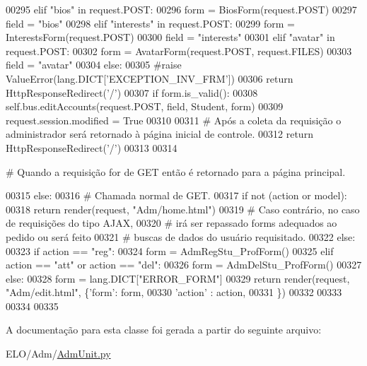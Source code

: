 \begin{DoxyCode}
00295             \textcolor{keywordflow}{elif} \textcolor{stringliteral}{"bios"} \textcolor{keywordflow}{in} request.POST:
00296                 form = BiosForm(request.POST)
00297                 field = \textcolor{stringliteral}{"bios"}
00298             \textcolor{keywordflow}{elif} \textcolor{stringliteral}{"interests"} \textcolor{keywordflow}{in} request.POST:
00299                 form = InterestsForm(request.POST)
00300                 field = \textcolor{stringliteral}{"interests"}
00301             \textcolor{keywordflow}{elif} \textcolor{stringliteral}{"avatar"} \textcolor{keywordflow}{in} request.POST:
00302                 form = AvatarForm(request.POST, request.FILES)
00303                 field = \textcolor{stringliteral}{"avatar"}
00304             \textcolor{keywordflow}{else}:
00305                 \textcolor{comment}{#raise ValueError(lang.DICT['EXCEPTION\_INV\_FRM'])
}
00306                 \textcolor{keywordflow}{return} HttpResponseRedirect(\textcolor{stringliteral}{'/'})
00307             \textcolor{keywordflow}{if} form.is\_valid():
00308                 self.bus.editAccounts(request.POST, field, Student, form)
00309                 request.session.modified = \textcolor{keyword}{True}                
00310 
00311             \textcolor{comment}{# Após a coleta da requisição o administrador será retornado à página inicial de controle.
}
00312             \textcolor{keywordflow}{return} HttpResponseRedirect(\textcolor{stringliteral}{'/'})
00313 
00314         \textcolor{comment}{# Quando a requisição for de GET então é retornado para a página principal.                        
                         
}
00315         \textcolor{keywordflow}{else}:
00316             \textcolor{comment}{# Chamada normal de GET.
}
00317             \textcolor{keywordflow}{if} \textcolor{keywordflow}{not} (action \textcolor{keywordflow}{or} model):
00318                 \textcolor{keywordflow}{return} render(request, \textcolor{stringliteral}{"Adm/home.html"})
00319             \textcolor{comment}{# Caso contrário, no caso de requisições do tipo AJAX, 
}
00320             \textcolor{comment}{#   irá ser repassado forms adequados ao pedido ou será feito
}
00321             \textcolor{comment}{#   buscas de dados do usuário requisitado.
}
00322             \textcolor{keywordflow}{else}:
00323                 \textcolor{keywordflow}{if} action == \textcolor{stringliteral}{"reg"}:
00324                     form = AdmRegStu\_ProfForm()
00325                 \textcolor{keywordflow}{elif} action == \textcolor{stringliteral}{"att"} \textcolor{keywordflow}{or} action == \textcolor{stringliteral}{"del"}:
00326                     form = AdmDelStu\_ProfForm()
00327                 \textcolor{keywordflow}{else}:
00328                     form = lang.DICT[\textcolor{stringliteral}{"ERROR\_FORM"}]
00329                 \textcolor{keywordflow}{return} render(request, \textcolor{stringliteral}{"Adm/edit.html"}, \{\textcolor{stringliteral}{'form'}: form,
00330                                                          \textcolor{stringliteral}{'action'} : action,
00331                                                         \})
00332 
00333 
00334 
00335 
\end{DoxyCode}


A documentação para esta classe foi gerada a partir do seguinte arquivo\+:\begin{DoxyCompactItemize}
\item 
E\+L\+O/\+Adm/\hyperlink{AdmUnit_8py}{Adm\+Unit.\+py}\end{DoxyCompactItemize}

